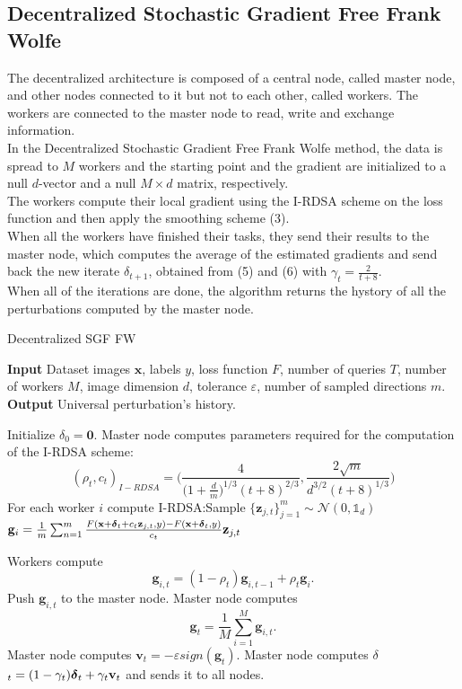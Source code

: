 \subsection{Decentralized Stochastic Gradient Free Frank Wolfe}
The decentralized architecture is composed of a central node, called master node, and other nodes connected to it but not to each other, called workers.
The workers are connected to the master node to read, write and exchange information.\\
In the Decentralized Stochastic Gradient Free Frank Wolfe method, the data is spread to $M$ workers and the starting point and the gradient are initialized to a null $d$-vector and a null $M \times d$ matrix, respectively.\\
The workers compute their local gradient using the I-RDSA scheme on the loss function and then apply the smoothing scheme (3).\\
When all the workers have finished their tasks, they send their results to the master node, which computes the average of the estimated gradients and send back the new iterate \mbox{\boldmath$ \delta$}$_{t+1}$, obtained from (5) and (6) with $\gamma_t = \frac{2}{t+8}$.\\
When all of the iterations are done, the algorithm returns the hystory of all the perturbations computed by the master node.

\begin{algorithm}
	\caption{Decentralized SGF FW}\label{decentralized} 
	 \textbf{Input} Dataset images $\mathbf{x}$, labels $y$, loss function $F$, number of queries $T$, number of workers $M$, image dimension $d$, tolerance $\varepsilon$, number of sampled directions $m$.\\
	 \textbf{Output} Universal perturbation's history.
	\begin{algorithmic}[1]		
		\State Initialize \mbox{\boldmath$ \delta$}$_{0} = \mathbf{0}$.
		\State Master node computes parameters required for the computation of the I-RDSA scheme: 
		{\scriptsize\[(\rho_t,c_t)_{I-RDSA} =\bigg(\frac{4}{\big(1+\frac{d}{m}\big)^{1/3}(t+8)^{2/3}}, \frac{2\sqrt{m}}{d^{3/2}(t+8)^{1/3}}\bigg)\]}
		\State For each worker $i$ compute I-RDSA:\newline Sample $\{\mathbf{z}_{j,t}\}_{j=1}^m \sim\mathcal{N}(0,\mathbb{1}_d)$ \newline
		 $\mathbf{g}_i = \frac{1}{m} \sum_{n=1}^{m} \frac{F(\mathbf{x} + \mbox{\scriptsize\boldmath$ \delta$}_t + c_t\mathbf{z}_{j,t}, y) - F(\mathbf{x} + \mbox{\scriptsize\boldmath$ \delta$}_t, y)}{c_t}\mathbf{z}_{j,t}$
		
		\State Workers compute \[\mathbf{g}_{i,t}= (1- \rho_t)\mathbf{g}_{i,t-1} + \rho_t\mathbf{g}_i.\]
		\State Push $\textbf{g}_{i,t}$ to the master node.
		\State Master node computes 
		\[\mathbf{g}_t = \frac{1}{M} \sum_{i=1}^{M} \mathbf{g}_{i,t}.\]
		\State Master node computes $\mathbf{v}_t = - \varepsilon sign(\mathbf{g}_t)$.
		\State Master node computes \mbox{\boldmath$ \delta$}$_t = (1-\gamma_t)\mbox{\boldmath$ \delta$}_t + \gamma_t\mathbf{v}_t$ and sends it to all nodes.
		\EndFor

	\end{algorithmic}
\end{algorithm}
